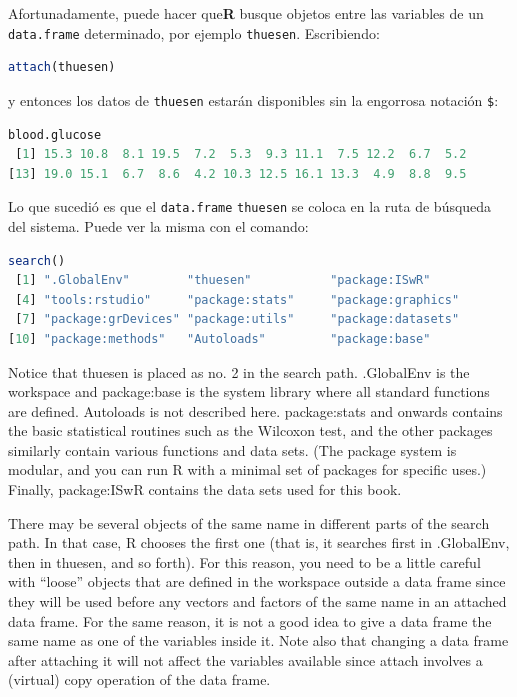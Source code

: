\documentclass[spanish]{extbook}
\numberwithin{equation}{section}
\numberwithin{figure}{section}
\begin{document}
Afortunadamente, puede hacer que\textbf{R} busque objetos entre las variables
de un \texttt{data.frame} determinado, por ejemplo \texttt{thuesen}. Escribiendo:

\begin{lstlisting}[language=R]
attach(thuesen)
\end{lstlisting}

y entonces los datos de \texttt{thuesen} estarán disponibles sin la engorrosa
notación \texttt{\$}:

\begin{lstlisting}[language=R]
blood.glucose
 [1] 15.3 10.8  8.1 19.5  7.2  5.3  9.3 11.1  7.5 12.2  6.7  5.2
[13] 19.0 15.1  6.7  8.6  4.2 10.3 12.5 16.1 13.3  4.9  8.8  9.5
\end{lstlisting}

Lo que sucedió es que el \texttt{data.frame} \texttt{thuesen} se coloca en la
ruta de búsqueda del sistema. Puede ver la misma con el comando:

\begin{lstlisting}[language=R]
search()
 [1] ".GlobalEnv"        "thuesen"           "package:ISwR"     
 [4] "tools:rstudio"     "package:stats"     "package:graphics" 
 [7] "package:grDevices" "package:utils"     "package:datasets" 
[10] "package:methods"   "Autoloads"         "package:base"     
\end{lstlisting}

Notice that thuesen is placed as no. 2 in the search path. .GlobalEnv
is the workspace and package:base is the system library where
all standard functions are defined. Autoloads is not described here.
package:stats and onwards contains the basic statistical routines such
as the Wilcoxon test, and the other packages similarly contain various functions and data sets. (The package system is modular, and you
can run R with a minimal set of packages for specific uses.) Finally,
package:ISwR contains the data sets used for this book.

There may be several objects of the same name in different parts of the
search path. In that case, R chooses the first one (that is, it searches first in
.GlobalEnv, then in thuesen, and so forth). For this reason, you need
to be a little careful with “loose” objects that are defined in the workspace
outside a data frame since they will be used before any vectors and factors
of the same name in an attached data frame. For the same reason, it is not a
good idea to give a data frame the same name as one of the variables inside
it. Note also that changing a data frame after attaching it will not affect the
variables available since attach involves a (virtual) copy operation of the
data frame.
\end{document}
